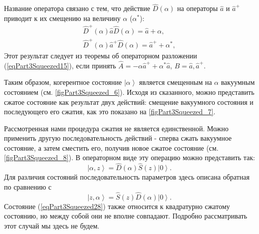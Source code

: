 Название оператора связано с тем, что действие
$\hat{D}\left(\alpha\right)$ на операторы $\hat{a}$ и $\hat{a}^{+}$
приводит к их смещению на величину $\alpha$ ($\alpha^{*}$):
\begin{eqnarray}
\hat{D}^{+}\left(\alpha\right)\hat{a}\hat{D}\left(\alpha\right) =
\hat{a} + \alpha,
\nonumber \\
\hat{D}^{+}\left(\alpha\right)\hat{a}^{+}\hat{D}\left(\alpha\right) =
\hat{a}^{+} + \alpha^{*},
\label{eqPart3SqueezedTaskOffset}
\end{eqnarray}
Этот результат следует из теоремы об операторном разложении
(\ref{eqPart3Squeezed15}), если принять $\hat{A} = - \alpha \hat{a}^{+}
+ \alpha^{*} \hat{a}$, $B=\hat{a}, \hat{a}^{+}$.



Таким образом, когерентное состояние $\left|\alpha\right>$ является
смещенным на $\alpha$ вакуумным состоянием
(см. \autoref{figPart3Squeezed_6}).
Исходя из сказанного, можно представить сжатое
состояние как результат двух действий: смещение вакуумного состояния и
последующего его сжатия, как это показано на
\autoref{figPart3Squeezed_7}. 




Рассмотренная нами процедура сжатия не является единственной. Можно
применить другую последовательность действий - сперва сжать вакуумное
состояние, а затем сместить его, получив новое сжатое состояние
(см. \autoref{figPart3Squeezed_8}). В операторном виде эту операцию
можно представить так:
\begin{equation}
\left|\alpha, z\right> =
\hat{D}\left(\alpha\right)\hat{S}\left(z\right) \left|0\right>.
\label{eqPart3Squeezed28}
\end{equation}
Для различия состояний последовательность параметров здесь описана
обратная по сравнению с 
\[
\left|z,\alpha\right> =
\hat{S}\left(z\right) \hat{D}\left(\alpha\right)\left|0\right>.
\]
Состояние (\ref{eqPart3Squeezed28}) также относится к квадратурно
сжатому состоянию, но между собой они не вполне совпадают. Подробно
рассматривать этот случай мы здесь не будем.




